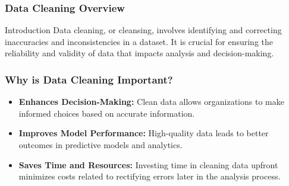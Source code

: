 \documentclass[aspectratio=169]{beamer}
\begin{document}
\begin{frame}[fragile]
    \frametitle{Data Cleaning Overview}
    \begin{block}{Introduction}
        Data cleaning, or cleansing, involves identifying and correcting inaccuracies and inconsistencies in a dataset. It is crucial for ensuring the reliability and validity of data that impacts analysis and decision-making.
    \end{block}
\end{frame}

\begin{frame}[fragile]
    \frametitle{Why is Data Cleaning Important?}
    \begin{itemize}
        \item \textbf{Enhances Decision-Making:} Clean data allows organizations to make informed choices based on accurate information.
        \item \textbf{Improves Model Performance:} High-quality data leads to better outcomes in predictive models and analytics.
        \item \textbf{Saves Time and Resources:} Investing time in cleaning data upfront minimizes costs related to rectifying errors later in the analysis process.
    \end{itemize}
\end{frame}
\end{document}
